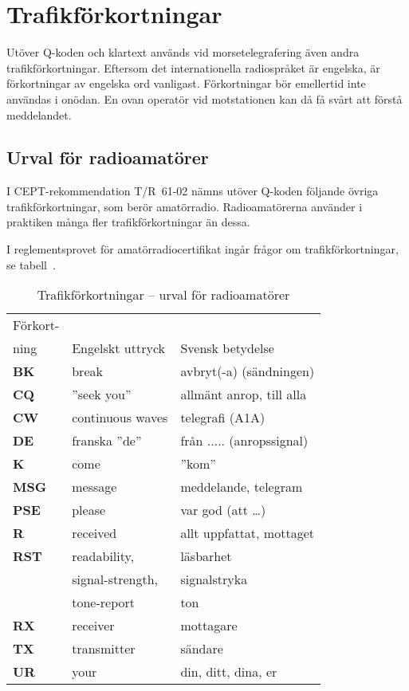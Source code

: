 \section{Trafikförkortningar}
\label{trafikförkortningar}

Utöver Q-koden och klartext används vid morsetelegrafering även andra
trafikförkortningar.
Eftersom det internationella radiospråket är engelska, är förkortningar av
engelska ord vanligast.
Förkortningar bör emellertid inte användas i onödan.
En ovan operatör vid motstationen kan då få svårt att förstå meddelandet.

\subsection{Urval för radioamatörer}

I CEPT-rekommendation T/R~61-02 nämns utöver Q-koden följande övriga
trafikförkortningar, som berör amatörradio.
Radioamatörerna använder i praktiken många fler trafikförkortningar än dessa.

I reglementsprovet för amatörradiocertifikat ingår frågor om
trafikförkortningar, se tabell~.

\begin{table}
  \begin{tabular}{lll}
    Förkort- & & \\
    ning & Engelskt uttryck & Svensk betydelse \\
    \hline
    \textbf{BK} & break & avbryt(-a) (sändningen) \\
    \textbf{CQ} & ''seek you'' & allmänt anrop, till alla \\
    \textbf{CW} & continuous waves & telegrafi (A1A) \\
    \textbf{DE} & franska ''de'' & från ..... (anropssignal) \\
    \textbf{K}  & come & ''kom'' \\
    \textbf{MSG} & message & meddelande, telegram \\
    \textbf{PSE} & please & var god (att \dots) \\
    \textbf{R} & received & allt uppfattat, mottaget \\
    \textbf{RST} & readability, & läsbarhet \\
   & signal-strength, & signalstryka \\
   & tone-report & ton \\
    \textbf{RX} & receiver & mottagare \\
    \textbf{TX} & transmitter & sändare \\
    \textbf{UR} & your & din, ditt, dina, er \\
  \end{tabular}
\caption{Trafikförkortningar -- urval för radioamatörer}
\label{tab:trafikforkortningar}
\end{table}

